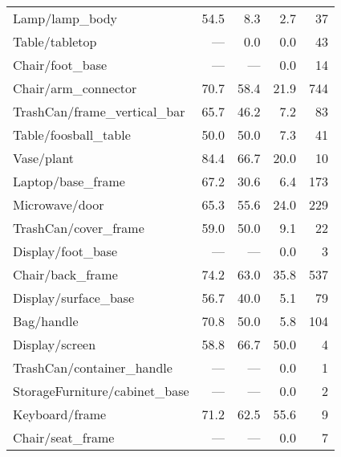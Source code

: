 \begin{table}[!htb]
\begin{tabular}{lrrrr}
Lamp/lamp\_body                 & 54.5 &        8.3 &     2.7 &             37 \\
Table/tabletop                 &  --- &        0.0 &     0.0 &             43 \\
Chair/foot\_base                &  --- &        --- &     0.0 &             14 \\
Chair/arm\_connector            & 70.7 &       58.4 &    21.9 &            744 \\
TrashCan/frame\_vertical\_bar    & 65.7 &       46.2 &     7.2 &             83 \\
Table/foosball\_table           & 50.0 &       50.0 &     7.3 &             41 \\
Vase/plant                     & 84.4 &       66.7 &    20.0 &             10 \\
Laptop/base\_frame              & 67.2 &       30.6 &     6.4 &            173 \\
Microwave/door                 & 65.3 &       55.6 &    24.0 &            229 \\
TrashCan/cover\_frame           & 59.0 &       50.0 &     9.1 &             22 \\
Display/foot\_base              &  --- &        --- &     0.0 &              3 \\
Chair/back\_frame               & 74.2 &       63.0 &    35.8 &            537 \\
Display/surface\_base           & 56.7 &       40.0 &     5.1 &             79 \\
Bag/handle                     & 70.8 &       50.0 &     5.8 &            104 \\
Display/screen                 & 58.8 &       66.7 &    50.0 &              4 \\
TrashCan/container\_handle      &  --- &        --- &     0.0 &              1 \\
StorageFurniture/cabinet\_base  &  --- &        --- &     0.0 &              2 \\
Keyboard/frame                 & 71.2 &       62.5 &    55.6 &              9 \\
Chair/seat\_frame               &  --- &        --- &     0.0 &              7 \\
\bottomrule
\end{tabular}
\end{table}


